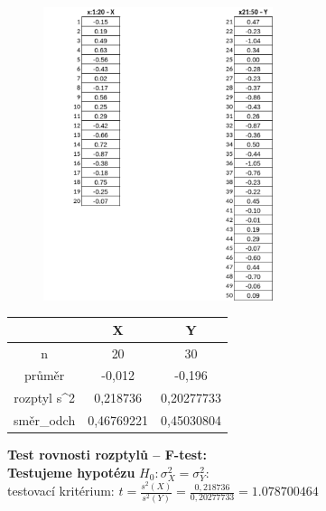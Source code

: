 \documentclass[11pt,a4paper]{article}
\begin{document}
\begin{figure}[H]
    \centering
    \includegraphics[width=0.60\textwidth]{img/1gtable.pdf}
\end{figure}

\begin{table}[]
    \centering
    \begin{tabular}{|c|c|c|}
    \hline
                                     & X                               & Y                               \\ \hline
    n                                & 20                              & 30                              \\ \hline
    průměr                           & -0,012                          & -0,196                          \\ \hline
    rozptyl s\textasciicircum{}2     & 0,218736                        & 0,20277733                      \\ \hline
    \multicolumn{1}{|l|}{směr\_odch} & \multicolumn{1}{l|}{0,46769221} & \multicolumn{1}{l|}{0,45030804} \\ \hline
    \end{tabular}
\end{table}

\textbf{Test rovnosti rozptylů – F-test:} \\

\textbf{Testujeme hypotézu} $H_0 : \sigma_{X}^2 = \sigma_{Y}^2 : $\\

testovací kritérium: $ t = \frac{s^2(X)}{s^2(Y)} = \frac{0,218736}{0,20277733} = 1.078700464 $ \\
\end{document}
